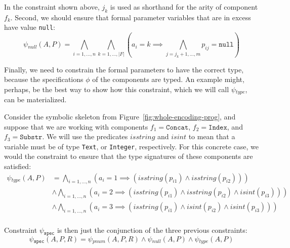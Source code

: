 \noindent
In the constraint shown above, $j_k$ is used as shorthand for the arity of
component $f_k$.
Second, we should ensure that formal parameter variables that are in excess
have value \lstinline{null}:
%
\[
  \psi{}_{null}(A, P) =
  \bigwedge_{i=1,\ldots,n} \bigwedge_{k=1,\ldots,|F|}
  (a_i = k \implies \bigwedge_{j=j_k+1,\ldots,m} p_{ij} = \mathtt{null})
\]

\noindent
Finally, we need to constrain the formal parameters to have the correct type,
because the specifications $\phi{}$ of the components are typed.
An example might, perhaps, be the best way to show how this constraint, which we
will call $\psi{}_{type}$, can be materialized.

\begin{example}
  Consider the symbolic skeleton from Figure~\ref{fig:whole-encoding-prog}, and
  suppose that we are working with components
  $f_1 = \mathtt{Concat}$, $f_2 = \mathtt{Index}$, and $f_3 = \mathtt{Substr}$.
  We will use the predicates $isstring$ and $isint$ to mean that a variable must
  be of type \lstinline{Text}, or \lstinline{Integer}, respectively.
  For this concrete case, we would the constraint to ensure that the type
  signatures of these components are satisfied:
  \begin{align*}
    \psi{}_{type}(A, P)
    &= \bigwedge_{i=1,\ldots,n}
      (a_i = 1 \implies (isstring(p_{i1}) \wedge isstring(p_{i2}))) \\
    &\wedge \bigwedge_{i=1,\ldots,n}
      (a_i = 2 \implies (isstring(p_{i1}) \wedge isstring(p_{i2}) \wedge isint(p_{i3}))) \\
    &\wedge \bigwedge_{i=1,\ldots,n}
      (a_i = 3 \implies (isstring(p_{i1}) \wedge isint(p_{i2}) \wedge isint(p_{i3}))) \\
  \end{align*}
\end{example}

\noindent
Constraint $\psi{}_{\mathtt{spec}}$ is then just the conjunction of the three
previous constraints:
%
\[
  \psi{}_{\mathtt{spec}}(A, P, R) =
  \psi{}_{pnum}(A, P, R) \wedge \psi{}_{null}(A, P) \wedge \psi{}_{type}(A, P)
\]


